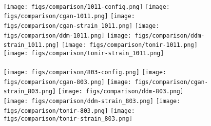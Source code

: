 \begin{figure}[!h]
\begin{graybox}
    \vspace{2pt}
    \\
    \texttt{[image: figs/comparison/1011-config.png]}\hspace{0.3cm}
    \texttt{[image: figs/comparison/cgan-1011.png]}\hspace{0.06cm}
    \texttt{[image: figs/comparison/cgan-strain\_1011.png]}\hspace{0.3cm}
    \texttt{[image: figs/comparison/ddm-1011.png]}\hspace{0.06cm}
    \texttt{[image: figs/comparison/ddm-strain\_1011.png]}\hspace{0.3cm}
    \texttt{[image: figs/comparison/tonir-1011.png]}\hspace{0.06cm}
    \texttt{[image: figs/comparison/tonir-strain\_1011.png]}
    \vspace{-1pt}
    \\
    \hspace{0.3cm}
    \hspace{0.06cm}
    \hspace{0.3cm}
    \hspace{0.06cm}
    \hspace{0.3cm}
    \hspace{0.06cm}
    \vspace{2pt}
    \\
    \texttt{[image: figs/comparison/803-config.png]}\hspace{0.3cm}
    \texttt{[image: figs/comparison/cgan-803.png]}\hspace{0.06cm}
    \texttt{[image: figs/comparison/cgan-strain\_803.png]}\hspace{0.3cm}
    \texttt{[image: figs/comparison/ddm-803.png]}\hspace{0.06cm}
    \texttt{[image: figs/comparison/ddm-strain\_803.png]}\hspace{0.3cm}
    \texttt{[image: figs/comparison/tonir-803.png]}\hspace{0.06cm}
    \texttt{[image: figs/comparison/tonir-strain\_803.png]}

\end{graybox}
\end{figure}
